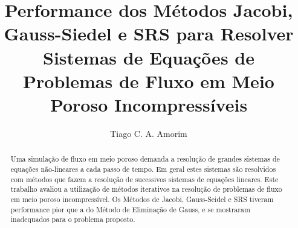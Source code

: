 \documentclass[final,5p]{elsarticle}
\numberwithin{equation}{section}
\begin{document}
\begin{frontmatter}



\title{Performance dos Métodos Jacobi, Gauss-Siedel e SRS para Resolver Sistemas de Equações de Problemas de Fluxo em Meio Poroso Incompressíveis}


\author{Tiago C. A. Amorim}

\begin{abstract}

        Uma simulação de fluxo em meio poroso demanda a resolução de grandes sistemas de equações não-lineares a cada passo de tempo. Em geral estes sistemas são resolvidos com métodos que fazem a resolução de sucessivos sistemas de equações lineares. Este trabalho avaliou a utilização de métodos iterativos na resolução de problemas de fluxo em meio poroso incompressível. Os Métodos de Jacobi, Gauss-Seidel e SRS tiveram performance pior que a do Método de Eliminação de Gauss, e se mostraram inadequados para o problema proposto.


\end{abstract}
\end{frontmatter}
\end{document}
